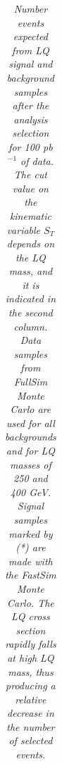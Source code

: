 \begin{table}[htbp]
\begin{center}
\begin{tabular}{|lcc||ccc|}
\hline\hline
\end{tabular}
\end{center}
\caption{\small \sl Number events expected from LQ signal and background samples after the analysis selection for 100 pb$^{-1}$ of data.
The cut value on the kinematic variable $S_T$ depends on the LQ mass, and it is indicated in the second column.
Data samples from FullSim Monte Carlo are used for all backgrounds and for LQ masses of 250 and 400 GeV. 
Signal samples marked by (*) are made with the FastSim Monte Carlo.
The LQ cross section rapidly falls at high LQ mass, thus producing a relative decrease in the number of selected events. } 
\label{tab:EventSelSummary}
\end{table}

